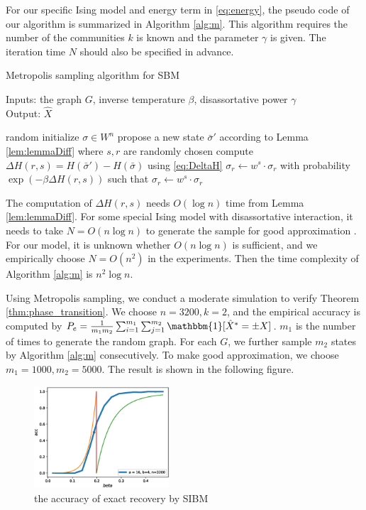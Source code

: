 \documentclass[journal]{IEEEtran}
\newcommand{\1}{\mathbbm{1}}
\begin{document}
For our specific Ising model and energy term in \eqref{eq:energy},
the pseudo code of our algorithm is summarized in Algorithm \ref{alg:m}.
This algorithm requires the number of the communities $k$ is known and the parameter $\gamma$ is given.
The iteration time $N$ should also be specified in advance.
\begin{algorithm}[H]
	\caption{Metropolis sampling algorithm for SBM} \label{alg:m}
	Inputs: the graph $G$, inverse temperature $\beta$, disassortative power $\gamma$ \\
	Output: $\hat{X}$
	\begin{algorithmic}[1]
		\STATE random initialize $\sigma \in W^n$
		\STATE propose a new state $\bar{\sigma}'$ according to Lemma \ref{lem:lemmaDiff} where $s, r$ are randomly chosen
		\STATE compute $\Delta H(r,s) = H(\bar{\sigma}') - H(\bar{\sigma})$ using \eqref{eq:DeltaH}
		\STATE $\sigma_r \leftarrow w^s \cdot \sigma_r$
		\ELSE
		\STATE with probability $\exp(-\beta \Delta H(r,s))$
			such that $\sigma_r \leftarrow w^s \cdot \sigma_r$
		\ENDIF
		\ENDFOR
	\end{algorithmic}
\end{algorithm}
The computation of $\Delta H(r,s)$ needs $O(\log n)$ time from Lemma \ref{lem:lemmaDiff}.
For some special Ising model with disassortative interaction, it needs to take $N=O(n\log n)$ to generate the sample for good approximation \cite{mcmc}. For our model, it is unknown whether $O(n\log n)$ is sufficient, and we empirically choose $N=O(n^2)$ in the experiments.
Then the time complexity of Algorithm \ref{alg:m} is $n^2 \log n$.

Using Metropolis sampling, we conduct a moderate simulation to verify Theorem \ref{thm:phase_transition}.
We choose $n=3200, k=2$, and the empirical accuracy is computed by $P_e = \frac{1}{m_1m_2}\sum_{i=1}^{m_1} \sum_{j=1}^{m_2} \mathbbm{1}[\hat{X}^* = \pm X]$. $m_1$ is the number of times to generate the random graph. For each $G$, we further sample $m_2$ states by Algorithm \ref{alg:m} consecutively.
To make good approximation, we choose $m_1=1000,m_2=5000$.
The result is shown in the following figure.
\begin{figure}[!ht]
	\includegraphics[width=0.45\textwidth]{beta_trans-2020-11-13.eps}
	\caption{the accuracy of exact recovery by SIBM}
\end{figure}
\end{document}
